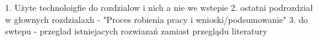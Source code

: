1. Użyte technoloigfie do rozdzialow i nich a nie we wstepie
2. ostatni podrozdział w głownych rozdzialaxh - "Proces robienia pracy i wnioski/podsumowanie"
3. do swtepu - przeglad istniejacych rozwiazań zamiast przeglądu literatury


